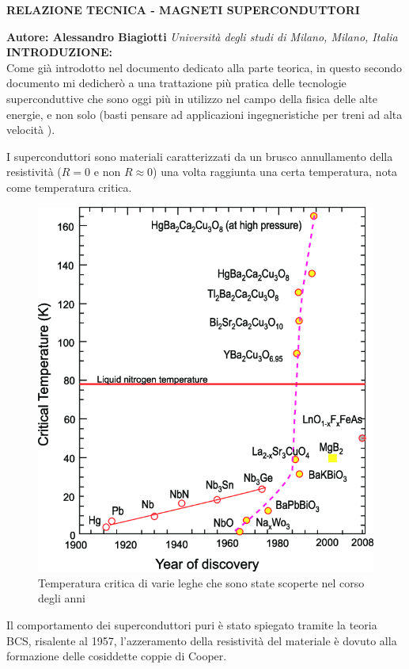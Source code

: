 \documentclass[a4paper,10pt]{article}
\begin{document}
\noindent
\begin{center}
	\textbf{{\Large RELAZIONE TECNICA - MAGNETI SUPERCONDUTTORI}} \\
\end{center}

\noindent
\textbf{Autore: Alessandro Biagiotti} \textit{Università degli studi di Milano,
	Milano, Italia}
\\

\noindent
\textbf{INTRODUZIONE:}
\\
Come già introdotto nel documento dedicato alla parte teorica, in questo secondo documento mi
dedicherò a una trattazione più pratica delle tecnologie superconduttive che sono oggi più in
utilizzo nel campo della fisica delle alte energie, e non solo (basti pensare ad applicazioni
ingegneristiche per treni ad alta velocità \cite{maglev}).

I superconduttori sono materiali caratterizzati da un brusco annullamento della resistività ($R =
	0$ e non $R \approx 0$) una volta raggiunta una certa temperatura, nota come temperatura
critica.
\begin{figure}[h!]
	\centering

	\includegraphics[scale=0.35]{fig/The-evolution-of-critical-temperatures-since-the-discovery-of-superconductivity.png}
	\caption{
		Temperatura critica di varie leghe che sono state scoperte nel corso degli anni
		\cite{critical-temp}
	}
\end{figure}
Il comportamento dei superconduttori puri è stato spiegato tramite la teoria BCS, risalente al
1957, l'azzeramento della resistività del materiale è dovuto alla formazione delle cosiddette
coppie di Cooper.
\end{document}
